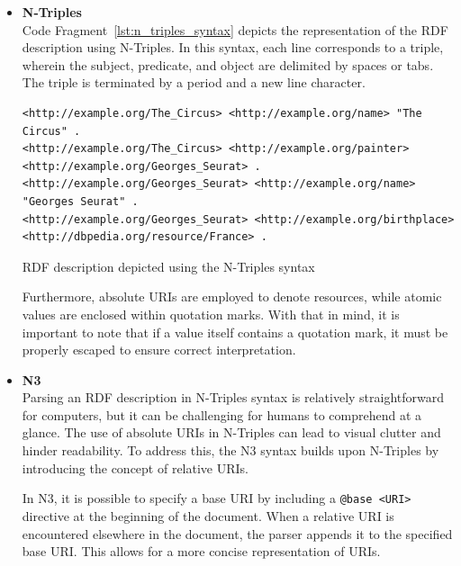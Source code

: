 \begin{itemize}

    \item \textbf{N-Triples}\\
    Code Fragment~\ref{lst:n_triples_syntax} depicts the representation of the RDF description using N-Triples. In this syntax, each line corresponds to a triple, wherein the subject, predicate, and object are delimited by spaces or tabs. The triple is terminated by a period and a new line character. \citep{seaborne2014rdf}

    \begin{listing}[htbp]
        \begin{verbatim}
<http://example.org/The_Circus> <http://example.org/name> "The Circus" .
<http://example.org/The_Circus> <http://example.org/painter> <http://example.org/Georges_Seurat> .
<http://example.org/Georges_Seurat> <http://example.org/name> "Georges Seurat" .
<http://example.org/Georges_Seurat> <http://example.org/birthplace> <http://dbpedia.org/resource/France> .
        \end{verbatim}
        \caption{RDF description depicted using the N-Triples syntax}
        \label{lst:n_triples_syntax}
    \end{listing}
    
    Furthermore, absolute URIs are employed to denote resources, while atomic values are enclosed within quotation marks. With that in mind, it is important to note that if a value itself contains a quotation mark, it must be properly escaped to ensure correct interpretation. \citep{seaborne2014rdf}

    \item \textbf{N3}\\
    Parsing an RDF description in N-Triples syntax is relatively straightforward for computers, but it can be challenging for humans to comprehend at a glance. The use of absolute URIs in N-Triples can lead to visual clutter and hinder readability. To address this, the N3 syntax builds upon N-Triples by introducing the concept of relative URIs. \citep{seaborne2014rdf}

    In N3, it is possible to specify a base URI by including a \texttt{@base <URI>} directive at the beginning of the document. When a relative URI is encountered elsewhere in the document, the parser appends it to the specified base URI. This allows for a more concise representation of URIs. \citep{berners2011notation3}


\end{itemize}
